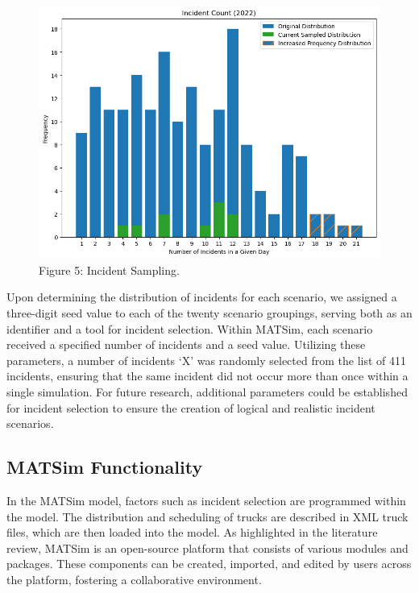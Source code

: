 \documentclass[
  letterpaper,
  authoryear]{elsarticle}
\begin{document}
\begin{figure}

{\centering \includegraphics{figures/inc_sampling.png}

}

\caption{\label{fig-Inc_Map}Figure 5: Incident Sampling.}

\end{figure}

Upon determining the distribution of incidents for each scenario, we
assigned a three-digit seed value to each of the twenty scenario
groupings, serving both as an identifier and a tool for incident
selection. Within MATSim, each scenario received a specified number of
incidents and a seed value. Utilizing these parameters, a number of
incidents `X' was randomly selected from the list of 411 incidents,
ensuring that the same incident did not occur more than once within a
single simulation. For future research, additional parameters could be
established for incident selection to ensure the creation of logical and
realistic incident scenarios.

\hypertarget{matsim-functionality}{%
\subsection{MATSim Functionality}\label{matsim-functionality}}

In the MATSim model, factors such as incident selection are programmed
within the model. The distribution and scheduling of trucks are
described in XML truck files, which are then loaded into the model. As
highlighted in the literature review, MATSim is an open-source platform
that consists of various modules and packages. These components can be
created, imported, and edited by users across the platform, fostering a
collaborative environment.
\end{document}
